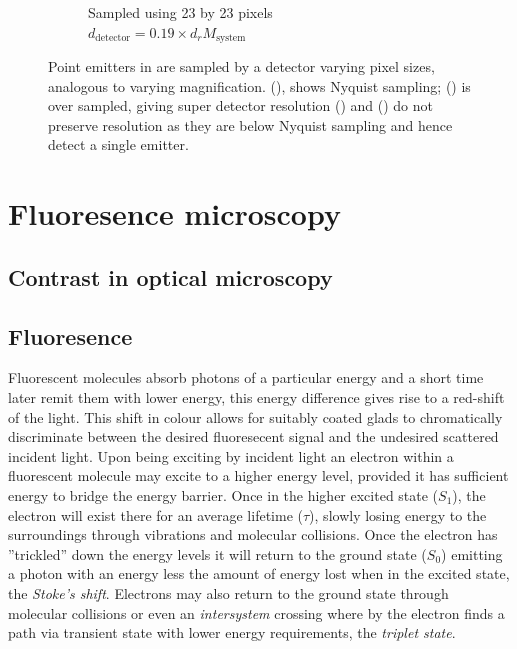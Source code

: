 \begin{figure}
\begin{subfigure}[b]{0.4\textwidth}
        \caption{Sampled using 23 by 23 pixels\\$d_{\text{detector}} = 0.19 \times d_{r}M_{\text{system}}$}
        \label{fig:digital_airy_sample_23}
    \end{subfigure}
    \caption{Point emitters in  are sampled by a detector varying pixel sizes, analogous to varying magnification.
    (), shows Nyquist sampling;
    () is over sampled, giving super detector resolution
    () and () do not preserve resolution as they are below Nyquist sampling and hence detect a single emitter.}
    \label{fig:airy_disk_resolution}
\end{figure}


%
%


\section{Fluoresence microscopy}
\subsection{Contrast in optical microscopy}
\subsection{Fluoresence}

Fluorescent molecules absorb photons of a particular energy and a short time later remit them with lower energy, this energy difference gives rise to a red-shift of the light.
This shift in colour allows for suitably coated glads to chromatically discriminate between the desired fluoresecent signal and the undesired scattered incident light.
Upon being exciting by incident light an electron within a fluorescent molecule may excite to a higher energy level, provided it has sufficient energy to bridge the energy barrier.
Once in the higher excited state ($S_1$), the electron will exist there for an average lifetime ($\tau$), slowly losing energy to the surroundings through vibrations and molecular collisions.
Once the electron has ''trickled'' down the energy levels it will return to the ground state ($S_0$) emitting a photon with an energy less the amount of energy lost when in the excited state, the \emph{Stoke's shift}.
Electrons may also return to the ground state through molecular collisions or even an \emph{intersystem} crossing where by the electron finds a path via transient state with lower energy requirements, the \emph{triplet state}.

